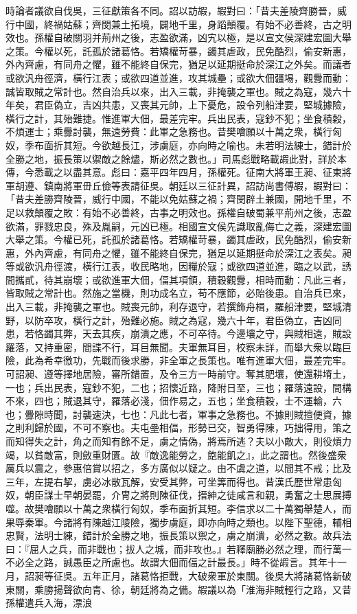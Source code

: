\begin{pinyinscope}
時論者議欲自伐吳，三征獻策各不同。詔以訪嘏，嘏對曰：「昔夫差陵齊勝晉，威行中國，終禍姑蘇；齊閔兼土拓境，闢地千里，身蹈顛覆。有始不必善終，古之明效也。孫權自破關羽并荊州之後，志盈欲滿，凶宄以極，是以宣文侯深建宏圖大舉之策。今權以死，託孤於諸葛恪。若矯權苛暴，蠲其虐政，民免酷烈，偷安新惠，外內齊慮，有同舟之懼，雖不能終自保完，猶足以延期挺命於深江之外矣。而議者或欲汎舟徑濟，橫行江表；或欲四道並進，攻其城壘；或欲大佃疆埸，觀釁而動：誠皆取賊之常計也。然自治兵以來，出入三載，非掩襲之軍也。賊之為寇，幾六十年矣，君臣偽立，吉凶共患，又喪其元帥，上下憂危，設令列船津要，堅城據險，橫行之計，其殆難捷。惟進軍大佃，最差完牢。兵出民表，寇鈔不犯；坐食積穀，不煩運士；乘釁討襲，無遠勞費：此軍之急務也。昔樊噲願以十萬之衆，橫行匈奴，季布面折其短。今欲越長江，涉虜庭，亦向時之喻也。未若明法練士，錯計於全勝之地，振長策以禦敵之餘燼，斯必然之數也。」司馬彪戰略載嘏此對，詳於本傳，今悉載之以盡其意。彪曰：嘉平四年四月，孫權死。征南大將軍王昶、征東將軍胡遵、鎮南將軍毌丘儉等表請征吳。朝廷以三征計異，詔訪尚書傅嘏，嘏對曰：「昔夫差勝齊陵晉，威行中國，不能以免姑蘇之禍；齊閔辟土兼國，開地千里，不足以救顛覆之敗：有始不必善終，古事之明效也。孫權自破蜀兼平荊州之後，志盈欲滿，罪戮忠良，殊及胤嗣，元凶已極。相國宣文侯先識取亂侮亡之義，深建宏圖大舉之策。今權已死，託孤於諸葛恪。若矯權苛暴，蠲其虐政，民免酷烈，偷安新惠，外內齊慮，有同舟之懼，雖不能終自保完，猶足以延期挺命於深江之表矣。昶等或欲汎舟徑渡，橫行江表，收民略地，因糧於寇；或欲四道並進，臨之以武，誘間攜貳，待其崩壞；或欲進軍大佃，偪其項領，積穀觀釁，相時而動：凡此三者，皆取賊之常計也。然施之當機，則功成名立，苟不應節，必貽後患。自治兵已來，出入三載，非掩襲之軍也。賊喪元帥，利存退守，若撰飾舟楫，羅船津要，堅城清野，以防卒攻，橫行之計，殆難必施。賊之為寇，幾六十年，君臣偽立，吉凶同患，若恪蠲其弊，天去其疾，崩潰之應，不可卒待。今邊壤之守，與賊相遠，賊設羅落，又持重密，間諜不行，耳目無聞。夫軍無耳目，校察未詳，而舉大衆以臨巨險，此為希幸徼功，先戰而後求勝，非全軍之長策也。唯有進軍大佃，最差完牢。可詔昶、遵等擇地居險，審所錯置，及令三方一時前守。奪其肥壤，使還耕塉土，一也；兵出民表，寇鈔不犯，二也；招懷近路，降附日至，三也；羅落遠設，間構不來，四也；賊退其守，羅落必淺，佃作易之，五也；坐食積穀，士不運輸，六也；釁隙時聞，討襲速決，七也：凡此七者，軍事之急務也。不據則賊擅便資，據之則利歸於國，不可不察也。夫屯壘相偪，形勢已交，智勇得陳，巧拙得用，策之而知得失之計，角之而知有餘不足，虜之情偽，將焉所逃？夫以小敵大，則役煩力竭，以貧敵富，則斂重財匱。故『敵逸能勞之，飽能飢之』，此之謂也。然後盛衆厲兵以震之，參惠倍賞以招之，多方廣似以疑之。由不虞之道，以間其不戒；比及三年，左提右挈，虜必冰散瓦解，安受其弊，可坐筭而得也。昔漢氏歷世常患匈奴，朝臣謀士早朝晏罷，介冑之將則陳征伐，搢紳之徒咸言和親，勇奮之士思展搏噬。故樊噲願以十萬之衆橫行匈奴，季布面折其短。李信求以二十萬獨舉楚人，而果辱秦軍。今諸將有陳越江陵險，獨步虜庭，即亦向時之類也。以陛下聖德，輔相忠賢，法明士練，錯計於全勝之地，振長策以禦之，虜之崩潰，必然之數。故兵法曰：『屈人之兵，而非戰也；拔人之城，而非攻也。』若釋廟勝必然之理，而行萬一不必全之路，誠愚臣之所慮也。故謂大佃而偪之計最長。」時不從嘏言。其年十一月，詔昶等征吳。五年正月，諸葛恪拒戰，大破衆軍於東關。後吳大將諸葛恪新破東關，乘勝揚聲欲向青、徐，朝廷將為之備。嘏議以為「淮海非賊輕行之路，又昔孫權遣兵入海，漂浪
\end{pinyinscope}
